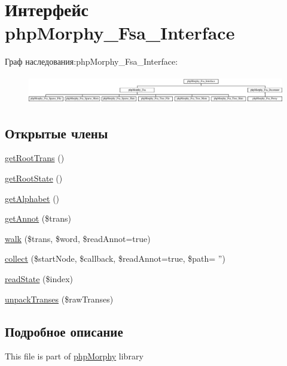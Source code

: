 \hypertarget{interfacephpMorphy__Fsa__Interface}{
\section{Интерфейс phpMorphy\_\-Fsa\_\-Interface}
\label{interfacephpMorphy__Fsa__Interface}
}
Граф наследования:phpMorphy\_\-Fsa\_\-Interface:\begin{figure}[H]
\begin{center}
\leavevmode
\includegraphics[height=1.237113cm]{interfacephpMorphy__Fsa__Interface}
\end{center}
\end{figure}
\subsection*{Открытые члены}
\begin{DoxyCompactItemize}
\item 
\hyperlink{interfacephpMorphy__Fsa__Interface_a4d3a622efd660bb180073ff6ac2526bd}{getRootTrans} ()
\item 
\hyperlink{interfacephpMorphy__Fsa__Interface_afc4bb4e25ae2dbd8fe2d1ff199c71020}{getRootState} ()
\item 
\hyperlink{interfacephpMorphy__Fsa__Interface_aebc9b423323d338941a5256d5dedf344}{getAlphabet} ()
\item 
\hyperlink{interfacephpMorphy__Fsa__Interface_a6869cabce7a226247cc451b8e85cd4cf}{getAnnot} (\$trans)
\item 
\hyperlink{interfacephpMorphy__Fsa__Interface_a6e249e8e54705e4c1d9399ff0e491ce0}{walk} (\$trans, \$word, \$readAnnot=true)
\item 
\hyperlink{interfacephpMorphy__Fsa__Interface_a256ec25980bdb3d5275374225c6ef183}{collect} (\$startNode, \$callback, \$readAnnot=true, \$path= '')
\item 
\hyperlink{interfacephpMorphy__Fsa__Interface_adc761163b59286b33dec722702d227d3}{readState} (\$index)
\item 
\hyperlink{interfacephpMorphy__Fsa__Interface_a103abeef01d8e75da765fdd533a6dc00}{unpackTranses} (\$rawTranses)
\end{DoxyCompactItemize}


\subsection{Подробное описание}
This file is part of \hyperlink{classphpMorphy}{phpMorphy} library

